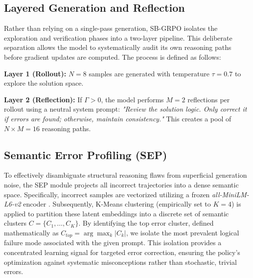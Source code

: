 \subsection{Layered Generation and Reflection}\label{subsec:layer-generation-reflection}
Rather than relying on a single-pass generation, SB-GRPO isolates the exploration and verification phases into a two-layer pipeline. This deliberate separation allows the model to systematically audit its own reasoning paths before gradient updates are computed. The process is defined as follows:

\textbf{Layer 1 (Rollout):} $N=8$ samples are generated with temperature $\tau=0.7$ to explore the solution space.

\textbf{Layer 2 (Reflection):} If $\Gamma > 0$, the model performs $M=2$ reflections per rollout using a neutral system prompt: \textit{"Review the solution logic. Only correct it if errors are found; otherwise, maintain consistency."} This creates a pool of $N \times M = 16$ reasoning paths.


\subsection{Semantic Error Profiling (SEP)}\label{subsec:SEP}
To effectively disambiguate structural reasoning flaws from superficial generation noise, the SEP module projects all incorrect trajectories into a dense semantic space. Specifically, incorrect samples are vectorized utilizing a frozen \textit{all-MiniLM-L6-v2} encoder \cite{reimers2019sentencebertsentenceembeddingsusing}. Subsequently, K-Means clustering \cite{article} (empirically set to $K=4$) is applied to partition these latent embeddings into a discrete set of semantic clusters $C = \{C_1, \dots, C_K\}$. By identifying the top error cluster, defined mathematically as $C_{top} = \arg\max_k |C_k|$, we isolate the most prevalent logical failure mode associated with the given prompt. This isolation provides a concentrated learning signal for targeted error correction, ensuring the policy's optimization against systematic misconceptions rather than stochastic, trivial errors.
